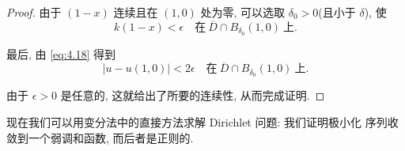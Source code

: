 \begin{proof}
由于 $(1-x)$ 连续且在 $(1,0)$ 处为零, 可以选取 $\delta_0>0$(且小于
$\delta$), 使
\begin{equation*}
k(1-x)<\epsilon\quad\text{在}\ \overline{D}\cap B_{\delta_0}(1,0)\ \text{上}.
\end{equation*}

最后, 由 \eqref{eq:4.18} 得到
\begin{equation*}
|u-u(1,0)|<2\epsilon
 \quad\text{在}\ \overline{D}\cap B_{\delta_0}(1,0)\ \text{上}.
\end{equation*}

由于 $\epsilon>0$ 是任意的, 这就给出了所要的连续性, 从而完成证明.
\end{proof}

现在我们可以用变分法中的直接方法求解 Dirichlet 问题: 我们证明极小化
序列收敛到一个弱调和函数, 而后者是正则的.

